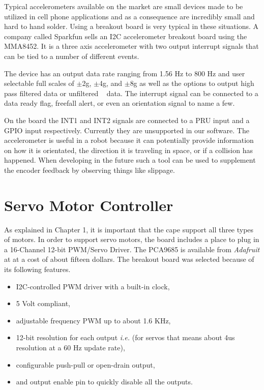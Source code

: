 \documentclass[12pt,oneside,final]{siuethesis}
\theoremstyle{definition}
\begin{document}
Typical accelerometers available on the market are small devices made to be utilized in cell phone applications and as a consequence are incredibly small and hard to hand solder. Using a breakout board is very typical in these situations. A company called Sparkfun sells an I2C accelerometer breakout board using the MMA8452. It is a three axis accelerometer with two output interrupt signals that can be tied to a number of different events. 

The device has an output data rate ranging from 1.56 Hz to 800 Hz and user selectable full scales of $\pm$2g, $\pm$4g, and $\pm$8g as well as the options to output high pass filtered data or unfiltered ~\cite{MMA8452Q} data. The interrupt signal can be connected to a data ready flag, freefall alert, or even an orientation signal to name a few.  

On the board the INT1 and INT2 signals are connected to a PRU input and a GPIO input respectively. Currently they are unsupported in our software. The accelerometer is useful in a robot because it can potentially provide information on how it is orientated, the direction it is traveling in space, or if a collision has happened. When developing in the future such a tool can be used to supplement the encoder feedback by observing things like slippage.

\section{Servo Motor Controller}

As explained in Chapter 1, it is important that the cape support all three types of motors. In order to support servo motors, the board includes a place to plug in a 16-Channel 12-bit PWM/Servo Driver. The PCA9685 is available from \emph{Adafruit} at at a cost of about fifteen dollars.  The breakout board was selected because of its following features.

\begin{itemize}
\item
I2C-controlled PWM driver with a built-in clock, 
\item
5 Volt compliant, 
\item
adjustable frequency PWM up to about 1.6 KHz,
\item
12-bit resolution for each output \emph{i.e.} (for servos that means about 4us resolution at a 60 Hz update rate),
\item
configurable push-pull or open-drain output,
\item
and output enable pin to quickly disable all the outputs.
\end{itemize}
\end{document}
